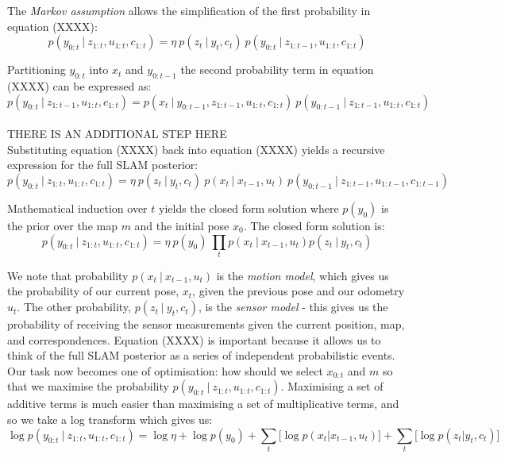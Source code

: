\documentclass[a4paper]{article}
\begin{document}
The \textit{Markov assumption} allows the simplification of the first probability in equation (XXXX):
\begin{equation}
p(y_{0:t} \ | \ z_{1:t}, u_{1:t}, c_{1:t}) = \eta \ p(z_t \ | \ y_t, c_t) \ p(y_{0:t} \ | \ z_{1:t-1}, u_{1:t}, c_{1:t})
\end{equation}

Partitioning $y_{0:t}$ into $x_t$ and $y_{0:t-1}$ the second probability term in equation (XXXX) can be expressed as:
\begin{equation}
p(y_{0:t} \ | \ z_{1:t-1}, u_{1:t}, c_{1:t}) = p(x_t \ | \ y_{0:t-1}, z_{1:t-1}, u_{1:t}, c_{1:t}) \ p(y_{0:t-1} \ | \ z_{1:t-1}, u_{1:t}, c_{1:t})
\end{equation}
\\
THERE IS AN ADDITIONAL STEP HERE
\\

Substituting equation (XXXX) back into equation (XXXX) yields a recursive expression for the full SLAM posterior:
\begin{equation}
p(y_{0:t} \ | \ z_{1:t}, u_{1:t}, c_{1:t}) = \eta \ p(z_t \ | \ y_t, c_t) \ p(x_t \ | \ x_{t-1}, u_t) \ p(y_{0:t-1} \ | \ z_{1:t-1}, u_{1:t-1}, c_{1:t-1})
\end{equation}

Mathematical induction over $t$ yields the closed form solution where $p(y_0)$ is the prior over the map $m$ and the initial pose $x_0$. The closed form solution is:
\begin{equation}
p(y_{0:t} \ | \ z_{1:t}, u_{1:t}, c_{1:t}) = \eta \ p(y_0) \ \prod_{t} p(x_t \ | \ x_{t-1}, u_t) p(z_t \ | \ y_t, c_t)
\end{equation}

We note that probability $p(x_t \ | \ x_{t-1}, u_t)$ is the \textit{motion model}, which gives us the probability of our current pose, $x_t$, given the previous pose and our odometry $u_t$. The other probability, $p(z_t \ | \ y_t, c_t)$, is the \textit{sensor model} - this gives us the probability of receiving the sensor measurements given the current position, map, and correspondences. Equation (XXXX) is important because it allows us to think of the full SLAM posterior as a series of independent probabilistic events. Our task now becomes one of optimisation: how should we select $x_{0:t}$ and $m$ so that we maximise the probability $p(y_{0:t} \ | \ z_{1:t}, u_{1:t}, c_{1:t})$. Maximising a set of additive terms is much easier than maximising a set of multiplicative terms, and so we take a log transform which gives us:
\begin{equation}
\log p(y_{0:t} \ | \ z_{1:t}, u_{1:t}, c_{1:t}) = \log \eta + \log p(y_0) + \sum_{t} \bigg[ \log p(x_t | x_{t-1}, u_t)  \bigg] + \sum_{t} \bigg[ \log p(z_t | y_t, c_t)  \bigg]
\end{equation}
\end{document}
